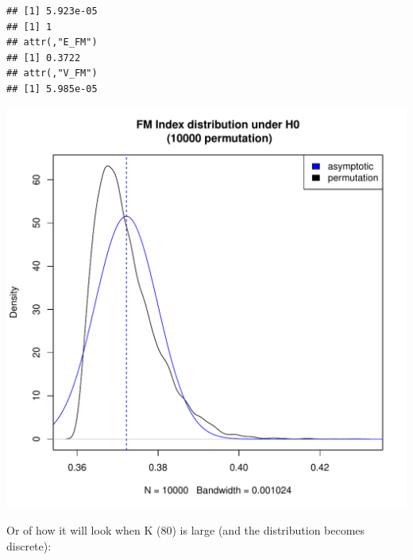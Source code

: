 \documentclass[shortnames,nojss,article]{jss}\usepackage[]{graphicx}\usepackage[]{color}
\makeatletter
\def\maxwidth{ %
  \ifdim\Gin@nat@width>\linewidth
    \linewidth
  \else
    \Gin@nat@width
  \fi
}
\newenvironment{kframe}{%
 \def\at@end@of@kframe{}%
 \ifinner\ifhmode%
  \def\at@end@of@kframe{\end{minipage}}%
  \begin{minipage}{\columnwidth}%
 \fi\fi%
 \def\FrameCommand##1{\hskip\@totalleftmargin \hskip-\fboxsep
 \colorbox{shadecolor}{##1}\hskip-\fboxsep
     \hskip-\linewidth \hskip-\@totalleftmargin \hskip\columnwidth}%
 \MakeFramed {\advance\hsize-\width
   \@totalleftmargin\z@ \linewidth\hsize
   \@setminipage}}%
 {\par\unskip\endMakeFramed%
 \at@end@of@kframe}
\newenvironment{knitrout}{}{} %
\makeatother
\begin{document}
\begin{knitrout}
\color{fgcolor}\begin{kframe}
\begin{verbatim}
## [1] 5.923e-05
## [1] 1
## attr(,"E_FM")
## [1] 0.3722
## attr(,"V_FM")
## [1] 5.985e-05
\end{verbatim}
\end{kframe}

{\centering \includegraphics[width=\maxwidth]{figure/FM_permutation_example_2} 

}



\end{knitrout}


Or of how it will look when K (80) is large (and the distribution becomes discrete):
\end{document}
